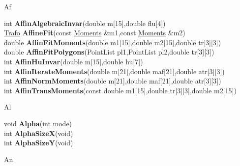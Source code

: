 \documentclass[10pt,titlepage]{article}
\def\functionlistentry#1#2#3#4#5#6{\noindent #1 {\bf #2}(#3) \dotfill #6\\}
\def\letterref#1{}
\def\letterlabel#1{\vspace{0.5cm}\centerline{\Large #1}}
\def\letterlabelend#1{}
\begin{document}
{{\letterlabel{Af}
\letterref{A}
\letterref{B}
\letterref{C}
\letterref{D}
\letterref{E}
\letterref{F}
\letterref{G}
\letterref{H}
\letterref{I}
\letterref{K}
\letterref{L}
\letterref{M}
\letterref{N}
\letterref{O}
\letterref{P}
\letterref{Q}
\letterref{R}
\letterref{S}
\letterref{T}
\letterref{U}
\letterref{V}
\letterref{W}
\letterref{X}
\letterref{Y}
\letterref{Z}

\letterref{Ac}
\letterref{Ad}
\letterref{Af}
\letterref{Al}
\letterref{An}
\letterref{Ap}
\letterref{Ar}
\letterref{As}
\letterlabelend{Af}
\functionlistentry{int}{AffinAlgebraicInvar}{double m[15],double flu[4]}{1615}{obsolet}{}
\functionlistentry{\hyperlink{Trafo}{Trafo}}{AffineFit}{const \hyperlink{Moments}{Moments} \&m1,const \hyperlink{Moments}{Moments} \&m2}{839}{moments}{}
\functionlistentry{double}{AffinFitMoments}{double m1[15],double m2[15],double tr[3][3]}{1620}{obsolet}{}
\functionlistentry{double}{AffinFitPolygons}{PointList pl1,PointList pl2,double tr[3][3]}{1621}{obsolet}{}
\functionlistentry{int}{AffinHuInvar}{double m[15],double hu[7]}{1616}{obsolet}{}
\functionlistentry{int}{AffinIterateMoments}{double m[21],double maf[21],double atr[3][3]}{1619}{obsolet}{}
\functionlistentry{int}{AffinNormMoments}{double m[21],double maf[21],double atr[3][3]}{1617}{obsolet}{}
\functionlistentry{int}{AffinTransMoments}{const double m1[15],double tr[3][3],double m2[15]}{1608}{obsolet}{}

\letterlabel{Al}
\letterref{A}
\letterref{B}
\letterref{C}
\letterref{D}
\letterref{E}
\letterref{F}
\letterref{G}
\letterref{H}
\letterref{I}
\letterref{K}
\letterref{L}
\letterref{M}
\letterref{N}
\letterref{O}
\letterref{P}
\letterref{Q}
\letterref{R}
\letterref{S}
\letterref{T}
\letterref{U}
\letterref{V}
\letterref{W}
\letterref{X}
\letterref{Y}
\letterref{Z}

\letterref{Ac}
\letterref{Ad}
\letterref{Af}
\letterref{Al}
\letterref{An}
\letterref{Ap}
\letterref{Ar}
\letterref{As}
\letterlabelend{Al}
\functionlistentry{void}{Alpha}{int mode}{1418}{genericTools}{}
\functionlistentry{int}{AlphaSizeX}{void}{1425}{genericTools}{}
\functionlistentry{int}{AlphaSizeY}{void}{1426}{genericTools}{}

\letterlabel{An}
\letterref{A}
\letterref{B}
\letterref{C}
\letterref{D}
\letterref{E}
\letterref{F}
\letterref{G}
\letterref{H}
\letterref{I}
\letterref{K}
\letterref{L}
\letterref{M}
\letterref{N}
\letterref{O}
\letterref{P}
\letterref{Q}
\letterref{R}
\letterref{S}
\letterref{T}
\letterref{U}
\letterref{V}
\letterref{W}
\letterref{X}
\letterref{Y}
\letterref{Z}

}}
\end{document}
